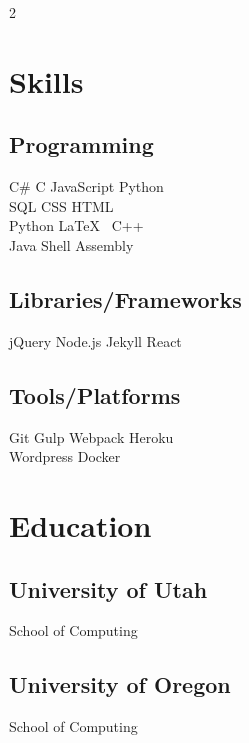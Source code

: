 \documentclass[]{plushcv}
\begin{document}
\begin{paracol}{2}
\section{Skills}
\subsection{Programming}
\sectionsep
{}
C\# \textbullet{} C \textbullet{} JavaScript \textbullet{} Python    \\ SQL \textbullet{} CSS \textbullet{} HTML \textbullet{} \\
\sectionsep
{}
Python \textbullet{} \LaTeX\ \textbullet{}  C++  \\
\sectionsep
{}
Java \textbullet{}  Shell \textbullet{} Assembly \\
\sectionsep
\sectionsep
\subsection{Libraries/Frameworks}
\sectionsep
jQuery \textbullet{} Node.js \textbullet{} Jekyll \textbullet{} React \\
\sectionsep
\sectionsep
\subsection{Tools/Platforms}
\sectionsep
Git \textbullet{} Gulp \textbullet{} Webpack \textbullet{} Heroku    \\ Wordpress \textbullet{} Docker \\

\sectionsep


\section{Education} 
\subsection{University of Utah}
School of Computing \\

\sectionsep
\subsection{University of Oregon}
School of Computing \\
\sectionsep


\end{paracol}
\end{document}
